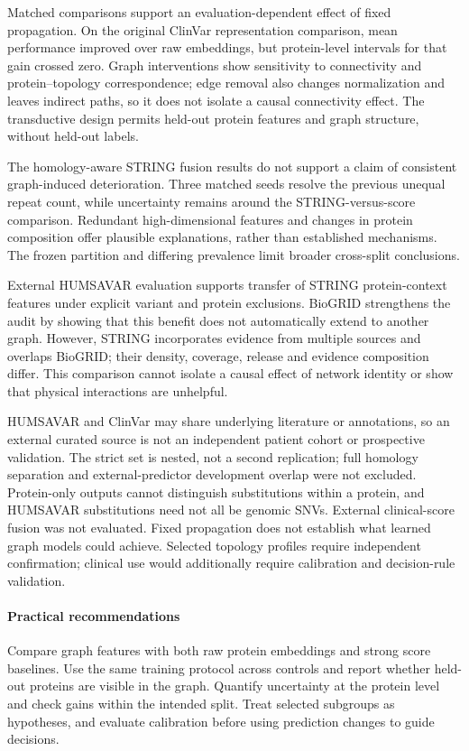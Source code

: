\documentclass[conference]{IEEEtran}
\begin{document}
Matched comparisons support an evaluation-dependent effect of fixed propagation. On the original ClinVar representation comparison, mean performance improved over raw embeddings, but protein-level intervals for that gain crossed zero. Graph interventions show sensitivity to connectivity and protein--topology correspondence; edge removal also changes normalization and leaves indirect paths, so it does not isolate a causal connectivity effect. The transductive design permits held-out protein features and graph structure, without held-out labels.

The homology-aware STRING fusion results do not support a claim of consistent graph-induced deterioration. Three matched seeds resolve the previous unequal repeat count, while uncertainty remains around the STRING-versus-score comparison. Redundant high-dimensional features and changes in protein composition offer plausible explanations, rather than established mechanisms. The frozen partition and differing prevalence limit broader cross-split conclusions.

External HUMSAVAR evaluation supports transfer of STRING protein-context features under explicit variant and protein exclusions. BioGRID strengthens the audit by showing that this benefit does not automatically extend to another graph. However, STRING incorporates evidence from multiple sources and overlaps BioGRID; their density, coverage, release and evidence composition differ. This comparison cannot isolate a causal effect of network identity or show that physical interactions are unhelpful.

HUMSAVAR and ClinVar may share underlying literature or annotations, so an external curated source is not an independent patient cohort or prospective validation. The strict set is nested, not a second replication; full homology separation and external-predictor development overlap were not excluded. Protein-only outputs cannot distinguish substitutions within a protein, and HUMSAVAR substitutions need not all be genomic SNVs. External clinical-score fusion was not evaluated. Fixed propagation does not establish what learned graph models could achieve. Selected topology profiles require independent confirmation; clinical use would additionally require calibration and decision-rule validation.

\paragraph{Practical recommendations}
Compare graph features with both raw protein embeddings and strong score baselines. Use the same training protocol across controls and report whether held-out proteins are visible in the graph. Quantify uncertainty at the protein level and check gains within the intended split. Treat selected subgroups as hypotheses, and evaluate calibration before using prediction changes to guide decisions.
\end{document}
